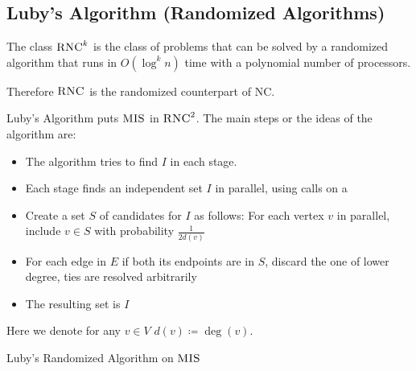 \subsection{Luby's Algorithm (Randomized Algorithms)}
\begin{definition}
	The class $\textsc{RNC}^{k}$ is the class of problems that can be solved by a randomized algorithm that runs in $O(\log^k n)$ time with a polynomial number of processors. 
\end{definition}
\begin{remark}
	Therefore $\textsc{RNC}$ is the randomized counterpart of NC.\parinn
\end{remark}
Luby's Algorithm puts $\textsc{MIS}$ in $\textsc{RNC}^2$. The main steps or the ideas of the algorithm are:\begin{itemize}
	\item The algorithm tries to find $I$ in each stage.
	\item Each stage finds an independent set $I$ in parallel, using calls on a 
	\item Create a set $S$ of candidates for $I$ as follows: For each vertex $v$ in parallel, include $v\in S$ with probability $\frac1{2d(v)}$
	\item For each edge in $E$ if both its endpoints are in $S$, discard the one of lower degree, ties are resolved arbitrarily
	\item The resulting set is $I$
\end{itemize}
Here we denote for any $v\in V$ $d(v)\coloneqq \deg(v)$. 
\begin{algorithm}
	\DontPrintSemicolon
	\caption{Luby's Randomized Algorithm on $\textsc{MIS}$\label{lubymis}}
\end{algorithm}


